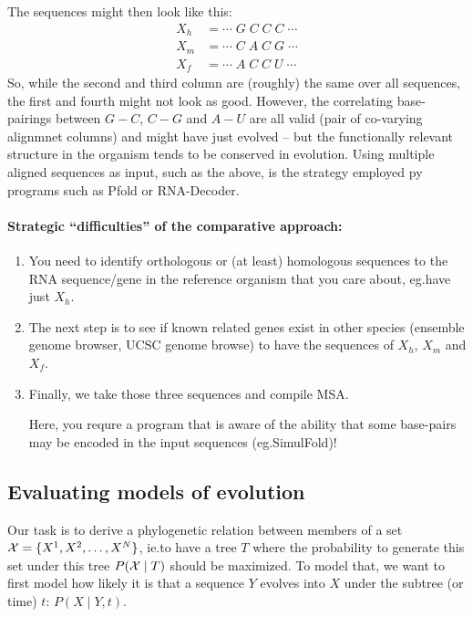 The sequences might then look like this:
\begin{align*}
X_h &= \dotsb\;G\;C\;C\;C\;\dotsb \\
X_m &= \dotsb\;C\;A\;C\;G\;\dotsb \\
X_f &= \dotsb\;A\;C\;C\;U\;\dotsb
\end{align*}
So, while the second and third column are (roughly) the same over all sequences,
the first and fourth might not look as good.  However, the correlating
base-pairings between \(G-C\), \(C-G\) and \(A-U\) are all valid (pair of
co-varying alignmnet columns) and might have just evolved -- but the
functionally relevant structure in the organism tends to be conserved in
evolution.  Using multiple aligned sequences as input, such as the above, is the
strategy employed py programs such as Pfold or RNA-Decoder.

\paragraph{Strategic \enquote{difficulties} of the comparative approach:}
\begin{enumerate}
\item You need to identify orthologous or (at least) homologous sequences to the
  RNA sequence/gene in the reference organism that you care about, eg.\@ have
  just \(X_h\).
\item The next step is to see if known related genes exist in other
  species (ensemble genome browser, UCSC genome browse) to have the sequences
  of \(X_h\), \(X_m\) and \(X_f\).
\item Finally, we take those three sequences
  and compile MSA\@.

  Here, you requre a program that is aware of the ability that some base-pairs
  may be encoded in the input sequences (eg.\@ SimulFold)!
\end{enumerate}


\subsection{Evaluating models of evolution}

Our task is to derive a phylogenetic relation between members of a set
\(\mathcal{X} = \{ X^1, X^2, \dotsc, X^N \}\), ie.\@ to have a tree \(T\) where
the probability to generate this set under this tree \(P(\mathcal{X} \mid T)\)
should be maximized.  To model that, we want to first model how likely it is
that a sequence \(Y\) evolves into \(X\) under the subtree (or time) \(t\):
\(P(X\mid Y, t)\).

